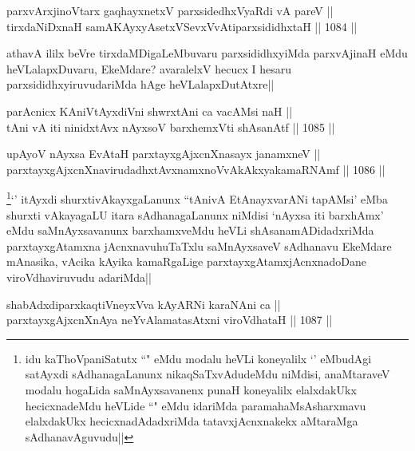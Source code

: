 
\begin{shl}
parxvArxjinoV\s tarx gaqhayxnetxV parxsidedhxVyaRdi vA pareV || \\
tirxdaNiDxnaH samAKAyxyAsetxVSevxVvAtiparxsididhxtaH ||  1084 ||  
\end{shl}

\begin{artha}
athavA ililx beVre tirxdaMDigaLeMbuvaru parxsididhxyiMda parxvAjinaH eMdu heVLalapxDuvaru, EkeMdare? avaralelxV hecucx I hesaru parxsididhxyiruvudariMda hAge heVLalapxDutAtxre||
\end{artha}


\begin{shl}
parAcnicx KAniVtAyxdiVni shwrxtAni ca vacAMsi naH || \\
tAni vA iti ninidxtAvx nAyxsoV barxhemxVti shAsanAtf ||  1085 ||  
\end{shl}
				
\begin{shl}
upAyoV nAyxsa EvAtaH parxtayxgAjxcnXnasayx janamxneV || \\
parxtayxgAjxcnXnavirudadhxtAvxnamxnoVvAkAkxyakamaRNAmf ||  1086 ||  
\end{shl}

\begin{artha}
\footnote{\stext \stext idu kaThoVpaniSatutx ``\stext" eMdu modalu heVLi koneyalilx `\stext' eMbudAgi satAyxdi sAdhanagaLanunx nikaqSaTxvAdudeMdu niMdisi, anaMtaraveV modalu hogaLida saMnAyxsavanenx punaH koneyalilx elalxdakUkx hecicxnadeMdu heVLide ``\stext" eMdu idariMda paramahaMsAsharxmavu elalxdakUkx hecicxnadAdadxriMda tatavxjAcnxnakekx aMtaraMga sAdhanavAguvudu||}`\stext' itAyxdi shurxtivAkayxgaLanunx ``tAnivA EtAnayxvarANi tapAMsi' eMba shurxti vAkayagaLU itara sAdhanagaLanunx niMdisi `nAyxsa iti barxhAmx' eMdu saMnAyxsavanunx barxhamxveMdu heVLi shAsanamADidadxriMda parxtayxgAtamxna jAcnxnavuhuTaTxlu saMnAyxsaveV sAdhanavu EkeMdare mAnasika, vAcika kAyika kamaRgaLige parxtayxgAtamxjAcnxnadoDane viroVdhaviruvudu adariMda||
\end{artha}


\begin{shl}
shabAdxdiparxkaqtiVneyxVva kAyARNi karaNAni ca || \\
parxtayxgAjxcnXnAya neYvAlamatasAtxni viroVdhataH ||  1087 ||  
\end{shl}	


